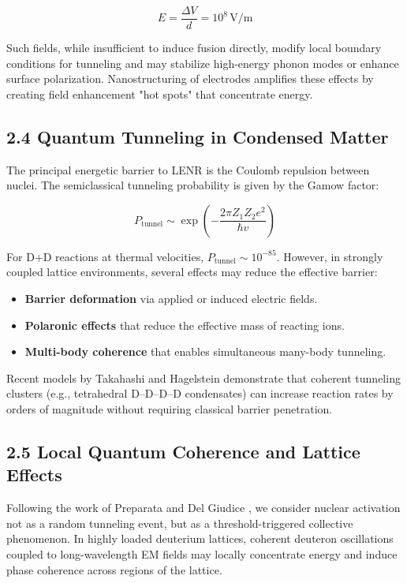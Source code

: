     \[
    E = \frac{\Delta V}{d} = 10^8\, \text{V/m}
    \]
    
    Such fields, while insufficient to induce fusion directly, modify local boundary conditions for tunneling and may stabilize high-energy phonon modes or enhance surface polarization. Nanostructuring of electrodes amplifies these effects by creating field enhancement "hot spots" that concentrate energy.
    
    \subsection{2.4 Quantum Tunneling in Condensed Matter}
    
    The principal energetic barrier to LENR is the Coulomb repulsion between nuclei. The semiclassical tunneling probability is given by the Gamow factor:
    
    \[
    P_{\text{tunnel}} \sim \exp\left(-\frac{2\pi Z_1 Z_2 e^2}{\hbar v}\right)
    \]
    
    For D+D reactions at thermal velocities, $P_{\text{tunnel}} \sim 10^{-85}$. However, in strongly coupled lattice environments, several effects may reduce the effective barrier:
    
    \begin{itemize}
        \item \textbf{Barrier deformation} via applied or induced electric fields.
        \item \textbf{Polaronic effects} that reduce the effective mass of reacting ions.
        \item \textbf{Multi-body coherence} that enables simultaneous many-body tunneling.
    \end{itemize}
    
    Recent models by Takahashi \cite{takahashi2004} and Hagelstein \cite{hagelstein2015} demonstrate that coherent tunneling clusters (e.g., tetrahedral D–D–D–D condensates) can increase reaction rates by orders of magnitude without requiring classical barrier penetration.
    
    \subsection{2.5 Local Quantum Coherence and Lattice Effects}
    
    Following the work of Preparata and Del Giudice \cite{preparata1991}, we consider nuclear activation not as a random tunneling event, but as a threshold-triggered collective phenomenon. In highly loaded deuterium lattices, coherent deuteron oscillations coupled to long-wavelength EM fields may locally concentrate energy and induce phase coherence across regions of the lattice.
    
